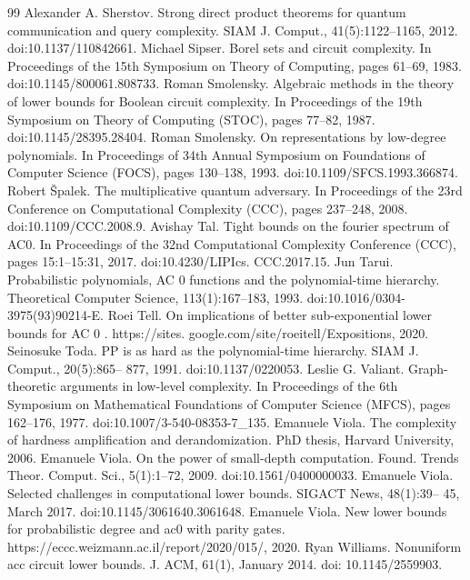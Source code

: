\documentclass[10pt,a4paper]{article}
\begin{document}
\begin{thebibliography}{99}
 Alexander A. Sherstov. Strong direct product theorems for quantum communication and query complexity. SIAM J. Comput., 41(5):1122–1165, 2012. doi:10.1137/110842661.
 Michael Sipser. Borel sets and circuit complexity. In Proceedings of the 15th Symposium on Theory of Computing, pages 61–69, 1983. doi:10.1145/800061.808733.
 Roman Smolensky. Algebraic methods in the theory of lower bounds for Boolean circuit complexity. In Proceedings of the 19th Symposium on Theory of Computing (STOC), pages 77–82, 1987. doi:10.1145/28395.28404.
 Roman Smolensky. On representations by low-degree polynomials. In Proceedings of 34th Annual Symposium on Foundations of Computer Science (FOCS), pages 130–138, 1993. doi:10.1109/SFCS.1993.366874.
 Robert Špalek. The multiplicative quantum adversary. In Proceedings of the 23rd Conference on Computational Complexity (CCC), pages 237–248, 2008. doi:10.1109/CCC.2008.9.
 Avishay Tal. Tight bounds on the fourier spectrum of AC0. In Proceedings of the 32nd Computational Complexity Conference (CCC), pages 15:1–15:31, 2017. doi:10.4230/LIPIcs. CCC.2017.15.
 Jun Tarui. Probabilistic polynomials, AC 0 functions and the polynomial-time hierarchy. Theoretical Computer Science, 113(1):167–183, 1993. doi:10.1016/0304-3975(93)90214-E.
 Roei Tell. On implications of better sub-exponential lower bounds for AC 0 . https://sites. google.com/site/roeitell/Expositions, 2020.
 Seinosuke Toda. PP is as hard as the polynomial-time hierarchy. SIAM J. Comput., 20(5):865– 877, 1991. doi:10.1137/0220053.
 Leslie G. Valiant. Graph-theoretic arguments in low-level complexity. In Proceedings of the 6th Symposium on Mathematical Foundations of Computer Science (MFCS), pages 162–176, 1977. doi:10.1007/3-540-08353-7\_135.
 Emanuele Viola. The complexity of hardness amplification and derandomization. PhD thesis, Harvard University, 2006.
 Emanuele Viola. On the power of small-depth computation. Found. Trends Theor. Comput. Sci., 5(1):1–72, 2009. doi:10.1561/0400000033.
 Emanuele Viola. Selected challenges in computational lower bounds. SIGACT News, 48(1):39– 45, March 2017. doi:10.1145/3061640.3061648.
 Emanuele Viola. New lower bounds for probabilistic degree and ac0 with parity gates. https://eccc.weizmann.ac.il/report/2020/015/, 2020.
 Ryan Williams. Nonuniform acc circuit lower bounds. J. ACM, 61(1), January 2014. doi: 10.1145/2559903.

\end{thebibliography}
\end{document}
